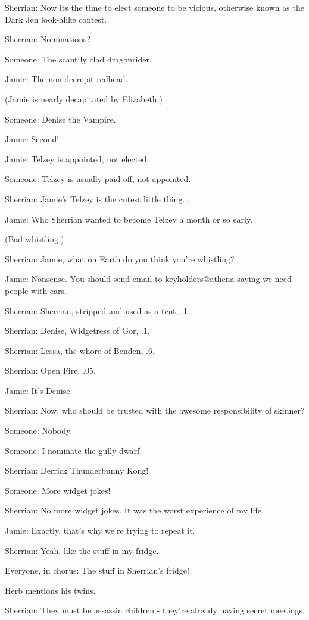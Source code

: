 \documentclass[12pt]{article}
\begin{document}
Sherrian: Now its the time to elect someone to be vicious, otherwise known as the Dark Jen look-alike contest.

Sherrian: Nominations?

Someone: The scantily clad dragonrider.

Jamie: The non-decrepit redhead.

(Jamie is nearly decapitated by Elizabeth.)

Someone: Denise the Vampire.

Jamie: Second!

Jamie: Telzey is appointed, not elected.

Someone: Telzey is usually paid off, not appointed.

Sherrian: Jamie's Telzey is the cutest little thing...

Jamie: Who Sherrian wanted to become Telzey a month or so early.

(Bad whistling.)

Sherrian: Jamie, what on Earth do you think you're whistling?

Jamie: Nonsense. You should send email to keyholders@athena saying we need people with cars. 

Sherrian: Sherrian, stripped and used as a tent, .1.

Sherrian: Denise, Widgetress of Gor, .1.

Sherrian: Lessa, the whore of Benden, .6.

Sherrian: Open Fire, .05.

Jamie: It's Denise.

Sherrian: Now, who should be trusted with the awesome responsibility of skinner?

Someone: Nobody.

Someone: I nominate the gully dwarf.

Sherrian: Derrick Thunderbunny Kong!

Someone: More widget jokes!

Sherrian: No more widget jokes. It was the worst experience of my life.

Jamie: Exactly, that's why we're trying to repeat it.

Sherrian: Yeah, like the stuff in my fridge.

Everyone, in chorus: The stuff in Sherrian's fridge!

Herb mentions his twins.

Sherrian: They must be assassin children - they're already having secret meetings.
\end{document}
